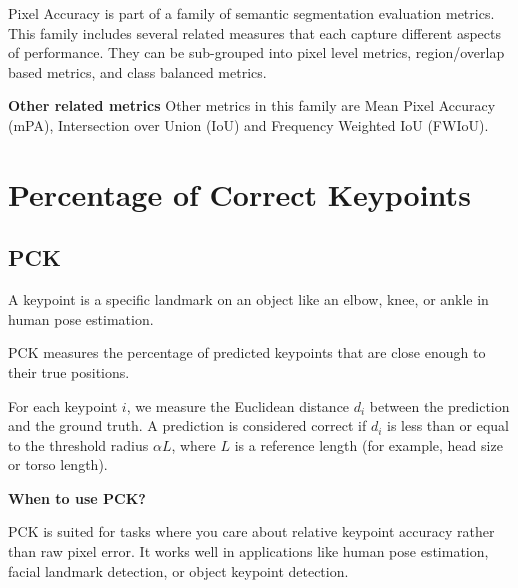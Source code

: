 {Pixel Accuracy is part of a family of semantic segmentation evaluation metrics. 
This family includes several related measures that each capture different aspects of performance.
They can be sub-grouped into pixel level metrics, region/overlap based metrics, and class balanced metrics.}

\textbf{Other related metrics}
Other metrics in this family are Mean Pixel Accuracy (mPA), Intersection over Union (IoU) and Frequency Weighted IoU (FWIoU).



\clearpage
\thispagestyle{cvstyle}
\section{Percentage of Correct Keypoints}
\subsection{PCK}

A keypoint is a specific landmark on an object like an elbow, knee, or ankle in human pose estimation.

PCK measures the percentage of predicted keypoints that are close enough to their true positions.

\begin{center}
\end{center}

For each keypoint $i$, we measure the Euclidean distance $d_i$ between the prediction and the ground truth.
A prediction is considered correct if $d_i$ is less than or equal to the threshold radius $\alpha L$, where $L$ is a reference length (for example, head size or torso length).


\textbf{When to use PCK?}

PCK is suited for tasks where you care about relative keypoint accuracy rather than raw pixel error.
It works well in applications like human pose estimation, facial landmark detection, or object keypoint detection. 

